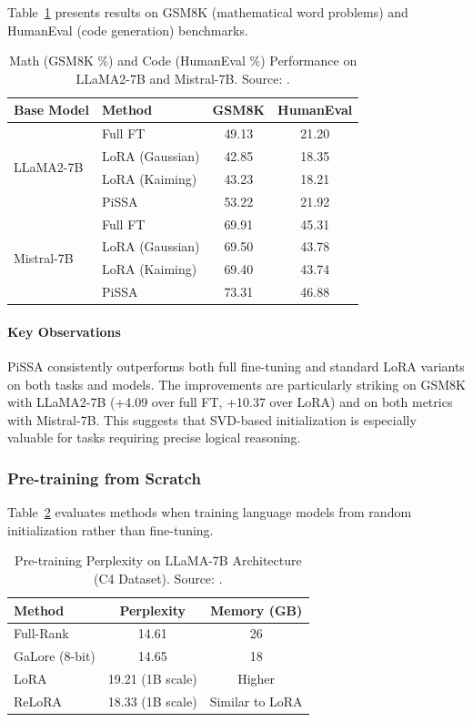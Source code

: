 Table~\ref{tab:math-code} presents results on GSM8K (mathematical word problems) and HumanEval (code generation) benchmarks.

\begin{table}[H]
  \centering
  \caption{Math (GSM8K \%) and Code (HumanEval \%) Performance on LLaMA2-7B and Mistral-7B. Source: \cite{meng2024pissa}.}
  \label{tab:math-code}
  \begin{tabular}{llcc}
    \toprule
    Base Model & Method & GSM8K & HumanEval \\
    \midrule
    \multirow{4}{*}{LLaMA2-7B} & Full FT & 49.13 & 21.20 \\
    & LoRA (Gaussian) & 42.85 & 18.35 \\
    & LoRA (Kaiming) & 43.23 & 18.21 \\
    & PiSSA & 53.22 & 21.92 \\
    \multirow{4}{*}{Mistral-7B} & Full FT & 69.91 & 45.31 \\
    & LoRA (Gaussian) & 69.50 & 43.78 \\
    & LoRA (Kaiming) & 69.40 & 43.74 \\
    & PiSSA & 73.31 & 46.88 \\
    \bottomrule
  \end{tabular}
\end{table}

\paragraph{Key Observations}
PiSSA consistently outperforms both full fine-tuning and standard LoRA variants on both tasks and models. The improvements are particularly striking on GSM8K with LLaMA2-7B (+4.09 over full FT, +10.37 over LoRA) and on both metrics with Mistral-7B. This suggests that SVD-based initialization is especially valuable for tasks requiring precise logical reasoning.

\subsubsection{Pre-training from Scratch}

Table~\ref{tab:pretrain-perplexity} evaluates methods when training language models from random initialization rather than fine-tuning.

\begin{table}[H]
  \centering
  \caption{Pre-training Perplexity on LLaMA-7B Architecture (C4 Dataset). Source: \cite{zhao2024galore}.}
  \label{tab:pretrain-perplexity}
  \begin{tabular}{lcc}
    \toprule
    Method & Perplexity & Memory (GB) \\
    \midrule
    Full-Rank & 14.61 & 26 \\
    GaLore (8-bit) & 14.65 & 18 \\
    LoRA & 19.21 (1B scale) & Higher \\
    ReLoRA & 18.33 (1B scale) & Similar to LoRA \\
    \bottomrule
  \end{tabular}
\end{table}


